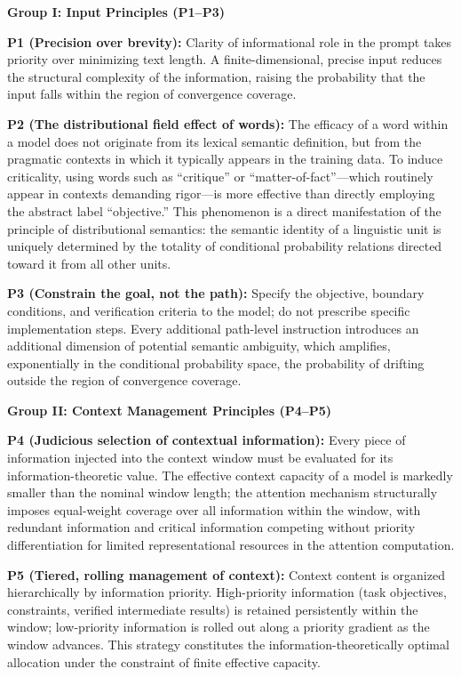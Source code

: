 \documentclass[11pt,a4paper]{article}
\theoremstyle{definition}
\begin{document}
\medskip
\textbf{Group I: Input Principles (P1--P3)}

\textbf{P1 (Precision over brevity):} Clarity of informational role in the prompt takes priority over minimizing text length. A finite-dimensional, precise input reduces the structural complexity of the information, raising the probability that the input falls within the region of convergence coverage.

\textbf{P2 (The distributional field effect of words):} The efficacy of a word within a model does not originate from its lexical semantic definition, but from the pragmatic contexts in which it typically appears in the training data. To induce criticality, using words such as ``critique'' or ``matter-of-fact''---which routinely appear in contexts demanding rigor---is more effective than directly employing the abstract label ``objective.'' This phenomenon is a direct manifestation of the principle of distributional semantics: the semantic identity of a linguistic unit is uniquely determined by the totality of conditional probability relations directed toward it from all other units.

\textbf{P3 (Constrain the goal, not the path):} Specify the objective, boundary conditions, and verification criteria to the model; do not prescribe specific implementation steps. Every additional path-level instruction introduces an additional dimension of potential semantic ambiguity, which amplifies, exponentially in the conditional probability space, the probability of drifting outside the region of convergence coverage.

\medskip
\textbf{Group II: Context Management Principles (P4--P5)}

\textbf{P4 (Judicious selection of contextual information):} Every piece of information injected into the context window must be evaluated for its information-theoretic value. The effective context capacity of a model is markedly smaller than the nominal window length; the attention mechanism structurally imposes equal-weight coverage over all information within the window, with redundant information and critical information competing without priority differentiation for limited representational resources in the attention computation.

\textbf{P5 (Tiered, rolling management of context):} Context content is organized hierarchically by information priority. High-priority information (task objectives, constraints, verified intermediate results) is retained persistently within the window; low-priority information is rolled out along a priority gradient as the window advances. This strategy constitutes the information-theoretically optimal allocation under the constraint of finite effective capacity.
\end{document}
